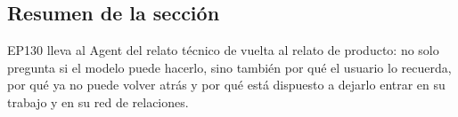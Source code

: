 \subsection{Resumen de la sección}

EP130 lleva al Agent del relato técnico de vuelta al relato de producto: no solo pregunta si el modelo puede hacerlo, sino también por qué el usuario lo recuerda, por qué ya no puede volver atrás y por qué está dispuesto a dejarlo entrar en su trabajo y en su red de relaciones.
